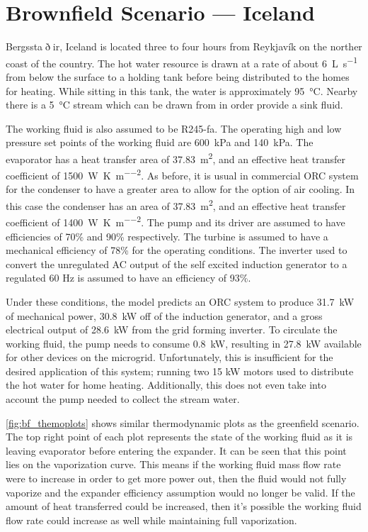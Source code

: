\section{Brownfield Scenario --- Iceland}
Bergssta$\eth$ir, Iceland is located three to four hours from Reykjavík on the norther coast of the country. The hot water resource is drawn at a rate of about \SI{6}{\liter\per\second} from below the surface to a holding tank before being distributed to the homes for heating. While sitting in this tank, the water is approximately \SI{95}{\degreeCelsius}. Nearby there is a \SI{5}{\degreeCelsius} stream which can be drawn from in order provide a sink fluid.

The working fluid is also assumed to be R245-fa. The operating high and low pressure set points of the working fluid are \SI{600}{\kilo\pascal} and \SI{140}{\kilo\pascal}. The evaporator has a heat transfer area of \SI{37.83}{\meter\squared}, and an effective heat transfer coefficient of \SI{1500}{\watt\per\kelvin\per\meter\squared}. As before, it is usual in commercial ORC system for the condenser to have a greater area to allow for the option of air cooling. In this case the condenser has an area of \SI{37.83}{\meter\squared}, and an effective heat transfer coefficient of \SI{1400}{\watt\per\kelvin\per\meter\squared}. The pump and its driver are assumed to have efficiencies of 70\% and 90\% respectively. The turbine is assumed to have a mechanical efficiency of 78\% for the operating conditions.
The inverter used to convert the unregulated AC output of the self excited induction generator to a regulated 60 Hz is assumed to have an efficiency of 93\%.

Under these conditions, the model predicts an ORC system to produce \SI{31.7}{\kilo\watt} of mechanical power, \SI{30.8}{\kilo\watt} off of the induction generator, and a gross electrical output of \SI{28.6}{\kilo\watt} from the grid forming inverter. To circulate the working fluid, the pump needs to consume \SI{0.8}{\kilo\watt}, resulting in \SI{27.8}{\kilo\watt} available for other devices on the microgrid. Unfortunately, this is insufficient for the desired application of this system;  running two 15 kW motors used to distribute the hot water for home heating. Additionally, this does not even take into account the pump needed to collect the stream water.

\autoref{fig:bf_themoplots} shows similar thermodynamic plots as the greenfield scenario. The top right point of each plot represents the state of the working fluid as it is leaving evaporator before entering the expander. It can be seen that this point lies on the vaporization curve. This means if the working fluid mass flow rate were to increase in order to get more power out, then the fluid would not fully vaporize and the expander efficiency assumption would no longer be valid.
If the amount of heat transferred could be increased, then it's possible the working fluid flow rate could increase as well while maintaining full vaporization. 





